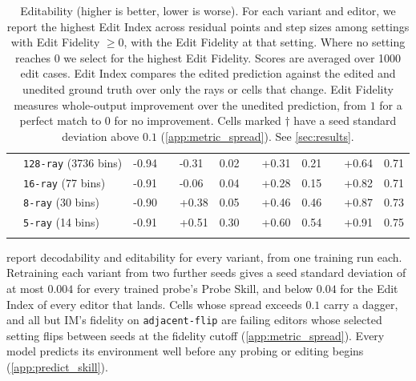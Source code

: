 \documentclass{article} %
\begin{document}
\begin{table}[t]
\begin{tabular}{ll E G EF G EF G EF}
& \texttt{128-ray} (3736 bins) & -0.94 & & -0.31 & 0.02 & & +0.31 & 0.21 & & +0.64 & 0.71 \\
& \texttt{16-ray} (77 bins)    & -0.91 & & -0.06 & 0.04 & & +0.28 & 0.15 & & +0.82 & 0.71 \\
& \texttt{8-ray} (30 bins)     & -0.90 & & +0.38 & 0.05 & & +0.46 & 0.46 & & +0.87 & 0.73 \\
& \texttt{5-ray} (14 bins)     & -0.91 & & +0.51 & 0.30 & & +0.60 & 0.54 & & +0.91 & 0.75 \\
\noalign{\vspace{0.75em}}
\hline
\end{tabular}
\caption{Editability (\textcolor{heatHiTxt}{higher} is better, \textcolor{heatLo}{lower} is worse). For each variant and editor, we report the highest Edit Index across residual points and step sizes among settings with Edit Fidelity $\geq 0$, with the Edit Fidelity at that setting. Where no setting reaches $0$ we select for the highest Edit Fidelity. Scores are averaged over 1000 edit cases. Edit Index compares the edited prediction against the edited and unedited ground truth over only the rays or cells that change. Edit Fidelity measures whole-output improvement over the unedited prediction, from $1$ for a perfect match to $0$ for no improvement. Cells marked $\dagger$ have a seed standard deviation above $0.1$ (\cref{app:metric_spread}). See \cref{sec:results}.}
\label{tab:editability}
\end{table}

 report decodability and editability for every variant, from one training run each. Retraining each variant from two further seeds gives a seed standard deviation of at most $0.004$ for every trained probe's Probe Skill, and below $0.04$ for the Edit Index of every editor that lands. Cells whose spread exceeds $0.1$ carry a dagger, and all but IM's fidelity on \texttt{adjacent-flip} are failing editors whose selected setting flips between seeds at the fidelity cutoff (\cref{app:metric_spread}). Every model predicts its environment well before any probing or editing begins (\cref{app:predict_skill}).
\end{document}
